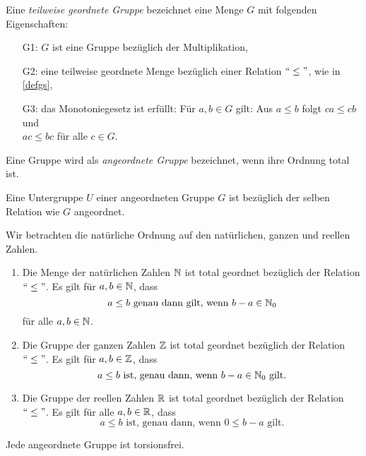 %
\begin{defn}\label{twgG} %
Eine \textit{teilweise geordnete Gruppe} bezeichnet eine Menge $G$ mit folgenden Eigenschaften: 
%
\begin{enumerate}
\item[G1:] $G$ ist eine Gruppe bezüglich der Multiplikation,
\item[G2:] eine teilweise geordnete Menge bezüglich einer Relation $``\leq " $, wie in \ref{defgs}, 
\item[G3:] das Monotoniegesetz ist erfüllt: Für $a, b \in  G$ gilt: Aus $a \leq b$ folgt $ca \leq  cb$ und \\ $ac \leq bc$ für alle $c \in G$.
\end{enumerate}
% 
\end{defn}
%
%
\begin{defn}\label{agG}
Eine Gruppe wird als \textit{angeordnete Gruppe} bezeichnet, wenn ihre Ordnung total ist.
\end{defn}
%
%
%
\begin{bsp}\label{beispielUntergruppeAngeordnet}
Eine Untergruppe $U$ einer angeordneten Gruppe $G$ ist bezüglich der selben Relation wie $G$ angeordnet.
\end{bsp}
%
\begin{bsp}\label{OrdnungNundZ}
Wir betrachten die natürliche Ordnung auf den natürlichen, ganzen und reellen Zahlen.
\begin{enumerate}
\item Die Menge der natürlichen Zahlen $\mathbb{N}$ ist total geordnet bezüglich der Relation $``\leq "$. Es gilt für $a, b \in \mathbb{N}$, dass
\[ a \leq b \text{ genau dann gilt, wenn } b-a \in \mathbb{N}_0
\]
für alle $a,b \in \mathbb{N}$.
\item Die Gruppe der ganzen Zahlen $\mathbb{Z}$ ist total geordnet bezüglich der Relation $``\leq "$. Es gilt für $a, b \in \mathbb{Z}$, dass
\[ a\leq b \text{ ist, genau dann, wenn } b -a \in \mathbb{N}_0 \text{ gilt.}
\]
\item Die Gruppe der reellen Zahlen $\mathbb{R}$ ist total geordnet bezüglich der Relation $``\leq "$. Es gilt für alle $a, b \in \mathbb{R}$, dass
\[a \leq b \text{ ist, genau dann, wenn } 0 \leq b -a \text{ gilt.} 
\]
\end{enumerate}
\end{bsp}
%
% 
%
%
\begin{bem} \label{angeordnetFolgtTorsionsfrei} %
Jede angeordnete Gruppe ist torsionsfrei. 
\end{bem}
%
